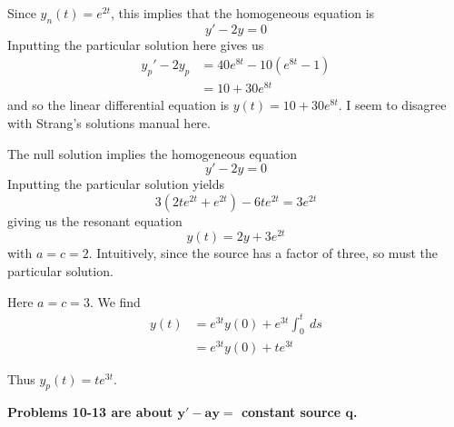 \documentclass[a4paper]{article}
\begin{document}

Since \(y_{n} \!\left( t \right) = e^{2t}\), this implies that the homogeneous equation is
\[
	y' - 2y = 0
\]
Inputting the particular solution here gives us
\begin{align*}
	y_{p}' - 2y_{p} & = 40 e^{8t} - 10 \!\left( e^{8t} - 1 \right) \\
			& = 10 + 30 e^{8t}
\end{align*}
and so the linear differential equation is \(y \!\left( t \right) = 10 + 30 e^{8t}\). I seem to disagree with Strang's solutions manual here.

\vspace{12pt}


The null solution implies the homogeneous equation
\[
	y' - 2y = 0
\]
Inputting the particular solution yields
\[
	3 \!\left( 2te^{2t} + e^{2t} \right) - 6te^{2t} = 3e^{2t}
\]
giving us the resonant equation
\[
	y \!\left( t \right) = 2y + 3e^{2t}
\]
with \(a = c = 2\). Intuitively, since the source has a factor of three, so must the particular solution.

\vspace{12pt}


Here \(a = c = 3\). We find
\begin{align*}
	y \!\left( t \right) & = e^{3t} y \!\left( 0 \right) + e^{3t} \int^{t}_{0} \ ds \\
			   & = e^{3t} y \!\left( 0 \right) + te^{3t}
\end{align*}

Thus \(y_{p} \!\left( t \right) = t e^{3t}\).

\vspace{12pt}

\textbf{Problems 10-13 are about \(\bm{y'-ay =}\) constant source \(\bm{q}\).}

\end{document}

